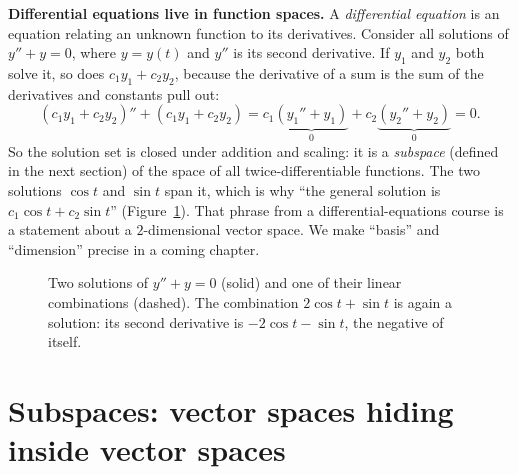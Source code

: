 \begin{connectionbox}
\textbf{Differential equations live in function spaces.} A \emph{differential equation}
is an equation relating an unknown function to its derivatives. Consider all solutions of
$y'' + y = 0$, where $y = y(t)$ and $y''$ is its second derivative. If $y_1$ and $y_2$ both
solve it, so does $c_1 y_1 + c_2 y_2$, because the derivative of a sum is the sum of the
derivatives and constants pull out:
\[
(c_1 y_1 + c_2 y_2)'' + (c_1 y_1 + c_2 y_2)
= c_1\underbrace{(y_1'' + y_1)}_{0} + c_2\underbrace{(y_2'' + y_2)}_{0} = 0.
\]
So the solution set is closed under addition and scaling: it is a \emph{subspace} (defined
in the next section) of the space of all twice-differentiable functions. The two solutions
$\cos t$ and $\sin t$ span it, which is why ``the general solution is
$c_1\cos t + c_2\sin t$'' (Figure~\ref{ch11:fig-ode}). That phrase from a
differential-equations course is a statement about a $2$-dimensional vector
space. We make ``basis'' and ``dimension'' precise in a coming chapter.
\end{connectionbox}

\begin{figure}[htbp]
\centering
{}
\caption{Two solutions of $y''+y=0$ (solid) and one of their linear combinations
(dashed). The combination $2\cos t + \sin t$ is again a solution: its second derivative is
$-2\cos t - \sin t$, the negative of itself.}
\label{ch11:fig-ode}
\end{figure}

\section{Subspaces: vector spaces hiding inside vector spaces}

